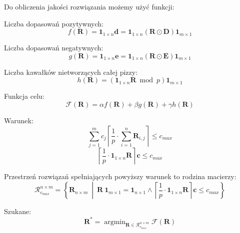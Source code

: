 \documentclass[a4paper,12pt]{article}
\DeclareMathOperator*{\argmin}{argmin}
\begin{document}
Do obliczenia jakości rozwiązania możemy użyć funkcji:

Liczba dopasowań pozytywnych:
$$
    f(\pmb{R}) = \pmb{1}_{1 \times n} \pmb{d} = \pmb{1}_{1 \times n} \left( \pmb{R} \odot \pmb{D} \right) \pmb{1}_{m \times 1}
$$

Liczba dopasowań negatywnych:
$$
    g(\pmb{R}) = \pmb{1}_{1 \times n} \pmb{e} = \pmb{1}_{1 \times n} \left( \pmb{R} \odot \pmb{E} \right) \pmb{1}_{m \times 1}
$$

Liczba kawałków nietworzących całej pizzy:
$$
    h(\pmb{R}) = \left( \pmb{1}_{1 \times n} \pmb{R} \bmod p \right) \pmb{1}_{m \times 1}
$$

Funkcja celu:
$$
    \mathcal{F}(\pmb{R}) = \alpha f(\pmb{R}) + \beta g(\pmb{R}) + \gamma h(\pmb{R})
$$

Warunek:
$$
    \sum_{j = 1}^{m} c_j \left\lceil \frac{1}{p} \cdot \sum_{i = 1}^{n} \pmb{R}_{i,j} \right\rceil \leq c_{max}
$$
$$
    \left\lceil \frac{1}{p} \cdot \pmb{1}_{1 \times n} \pmb{R} \right\rceil \pmb{c} \leq c_{max}
$$

Przestrzeń rozwiązań spełniających powyższy warunek to rodzina macierzy:
$$
    \mathcal{R}_{c_{max}}^{n \times m}
    = \left\{
    \pmb{R}_{n \times m}
    ~\middle|~
    \pmb{R} ~ \pmb{1}_{m \times 1} = \pmb{1}_{n \times 1}
    \land
    \left\lceil \frac{1}{p} \cdot \pmb{1}_{1 \times n}  \pmb{R} \right\rceil \pmb{c}
    \leq c_{max}
    \right\}
$$

Szukane:
$$
    \pmb{R}^{*}
    = \argmin_{\pmb{R} \in \mathcal{R}_{c_{max}}^{n \times m}} \mathcal{F}(\pmb{R})
$$
\end{document}

